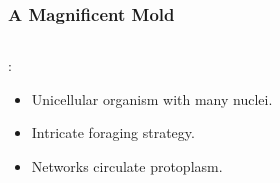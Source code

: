 \documentclass[	hyperref={pdfpagelabels=false}, xcolor=dvipsnames,
		11pt]{beamer}
\begin{document}
\begin{frame}
    \frametitle{A Magnificent Mold} 

	\begin{columns}
	\begin{column}{5cm}

	\begin{overprint}

		\begin{block}{\Pp:}
		  \begin{itemize}
		   \item<2-> Unicellular organism with many nuclei.
		   \item<3-> Intricate foraging strategy.
		   \item<4-> Networks circulate protoplasm.
		  \end{itemize}
		\end{block}

	\end{overprint}

	\end{column}

	\begin{column}{5cm}
	\begin{overprint}

	\testbox{
	\begin{minipage}[t]{5 cm}


\end{minipage}}
\end{overprint}
\end{column}
\end{columns}
\end{frame}
\end{document}
